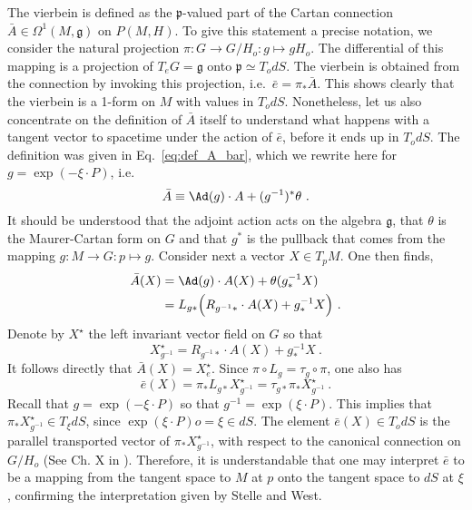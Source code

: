 \documentclass[11pt]{article}
\begin{document}
The vierbein is defined as the $\mathfrak{p}$-valued part of the 
Cartan connection $\bar{A} \in \Omega^1(M,\mathfrak{g})$ on 
$P(M,H)$. To give this statement a precise notation, we consider 
the natural projection $\pi : G \to G/H_o : g \mapsto gH_o$. The 
differential of this mapping is a projection of $T_eG = 
\mathfrak{g}$ onto $\mathfrak{p} \simeq T_o dS$. The vierbein is 
obtained from the connection by invoking this projection, 
i.e.~$\bar{e} = \pi_\ast \bar{A}$. This shows clearly that the 
vierbein is a 1-form on $M$ with values in $T_odS$. Nonetheless, 
let us also concentrate on the definition  of $\bar{A}$ itself to 
understand what happens with a tangent vector to spacetime under 
the action of $\bar{e}$, before it ends up in $T_o dS$. The 
definition  was given in Eq.~\eqref{eq:def_A_bar}, which we 
rewrite here for $g = \exp(-\xi\cdot P)$, i.e.~
\begin{displaymath}
	\bar{A} \equiv \Ad(g)\cdot A + (g^{-1})^\ast \theta~.
\end{displaymath}
It should be understood that the adjoint action acts on the 
algebra $\mathfrak{g}$, that $\theta$ is the Maurer-Cartan form 
on $G$ and that $g^\ast$ is the pullback that comes from the 
mapping $g: M \to G : p \mapsto g$. Consider next a vector $X \in 
T_pM$. One then finds,
\begin{align*}
	\bar{A}(X) &= \Ad(g)\cdot A(X) + \theta(g^{-1}_\ast X) \\
		&= L_{g\ast}\Big(R_{g^{-1}\ast}\cdot A(X) + g^{-1}_\ast X 
		\Big)~.
\end{align*}
Denote by $X^\star$ the left invariant vector field on $G$ so 
that
\begin{displaymath}
	X^\star_{g^{-1}} = R_{g^{-1}\ast}\cdot A(X) + g^{-1}_\ast X~.
\end{displaymath}
It follows directly that $\bar{A}(X) = X^\star_e$. Since $\pi 
\circ L_g = \tau_g \circ \pi$, one also has
\begin{displaymath}
	\bar{e}(X) = \pi_\ast L_{g\ast} X^\star_{g^{-1}}
	= \tau_{g\ast} \pi_\ast X^\star_{g^{-1}}~.
\end{displaymath}
Recall that $g = \exp(-\xi\cdot P)$ so that $g^{-1} = 
\exp(\xi\cdot P)$. This implies that $\pi_\ast X^\star_{g^{-1}} 
\in T_\xi dS$, since $\exp(\xi\cdot P)o = \xi \in dS$. The 
element $\bar{e}(X) \in T_o dS$ is the parallel transported 
vector of $\pi_\ast X^\star_{g^{-1}}$, with respect to the 
canonical connection on $G/H_o$ (See Ch. X in 
\cite{kob1996found}).  Therefore, it is understandable that one 
may interpret $\bar{e}$ to be a mapping from the tangent space to 
$M$ at $p$ onto the tangent space to $dS$ at $\xi$, confirming 
the interpretation given by Stelle and West.
\end{document}
